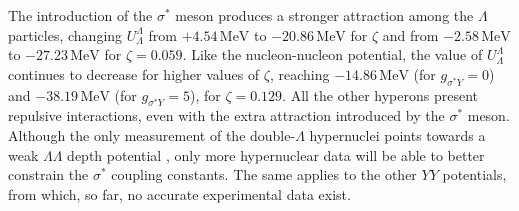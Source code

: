\documentclass[twocolumn,showpacs,aps]{revtex4}
\begin{document}
The introduction of the $\sigma^*$ meson produces a stronger attraction among the $\Lambda$ particles, 
changing $U_{\Lambda}^{\Lambda}$ from $+ 4.54\, \mathrm{MeV}$
  to $-20.86\, \mathrm{MeV}$
  for $\zeta$ and from $-2.58\, \mathrm{MeV}$
  to $-27.23\, \mathrm{MeV}$
  for $\zeta=0.059$.
Like the nucleon-nucleon potential, the value of $U_{\Lambda}^{\Lambda}$ continues to decrease for higher values
of $\zeta$, reaching $-14.86\, \mathrm{MeV}$
  (for $g_{\sigma^* Y}=0$) and $-38.19\, \mathrm{MeV}$
  (for $g_{\sigma^* Y}=5$), for $\zeta=0.129$.
All the other hyperons present repulsive interactions, even with the extra attraction introduced by the $\sigma^*$ meson.
Although the only measurement of the double-$\Lambda$ hypernuclei points towards a weak  $\Lambda \Lambda$ depth potential \cite{Millener:1988hp},
only more hypernuclear data will be able to better constrain the $\sigma^*$ coupling constants.
The same applies to the other $YY$ potentials, from which, so far, no accurate experimental data exist.
\end{document}
